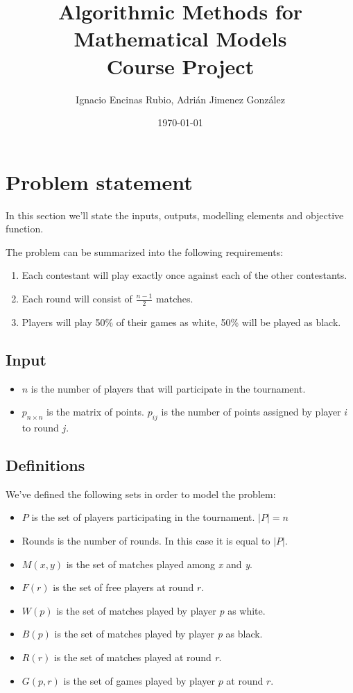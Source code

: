 \documentclass[a4paper, 10pt]{article}
\title{Algorithmic Methods for Mathematical Models\\Course Project}
\author{Ignacio Encinas Rubio, Adrián Jimenez González}
\date{\normalsize\today{}}
\begin{document}
\maketitle

\tableofcontents

\clearpage

\section{Problem statement}
In this section we'll state the inputs, outputs, modelling elements and objective function.

The problem can be summarized into the following requirements:

\begin{enumerate}
    \item Each contestant will play exactly once against each of the other contestants.
    \item Each round will consist of $\frac{n-1}{2}$ matches.
    \item Players will play 50\% of their games as white, 50\% will be played as black.
\end{enumerate}


\subsection{Input}
\begin{itemize}
    \item $n$ is the number of players that will participate in the tournament.
    \item $p_{n \times n}$ is the matrix of points. $p_{ij}$ is the number of points assigned by player $i$ to round $j$.
\end{itemize}

\subsection{Definitions}
We've defined the following sets in order to model the problem:

\begin{itemize}
    \item $P$ is the set of players participating in the tournament. $|P| = n$
    \item Rounds is the number of rounds. In this case it is equal to $|P|$.
    \item $M(x, y)$  is the set of matches played among \textit{x} and \textit{y}.
    \item $F(r)$ is the set of free players at round $r$.
    \item $W(p)$ is the set of matches played by player \textit{p} as white.
    \item $B(p)$ is the set of matches played by player \textit{p} as black.
    \item $R(r)$  is the set of matches played at round \textit{r}.
    \item $G(p,r)$ is the set of games played by player $p$ at round $r$.
\end{itemize}
\end{document}
